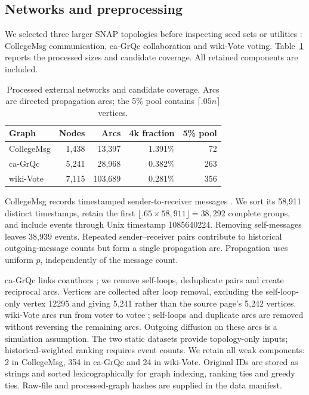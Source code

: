 \documentclass[smallextended]{svjour3}
\begin{document}
\subsection{Networks and preprocessing}
We selected three larger SNAP topologies before inspecting seed sets or utilities \cite{snap}: CollegeMsg communication, ca-GrQc collaboration and wiki-Vote voting. Table~\ref{tab:data} reports the processed sizes and candidate coverage. All retained components are included.
\begin{table}[htbp]
\caption{Processed external networks and candidate coverage. Arcs are directed propagation arcs; the 5\% pool contains $\lceil .05n\rceil$ vertices.}\label{tab:data}
\begin{tabular}{lrrrr}
\toprule
Graph & Nodes & Arcs & 4k fraction & 5\% pool \\
\midrule
CollegeMsg & 1,438 & 13,397 & 1.391\% & 72 \\
ca-GrQc & 5,241 & 28,968 & 0.382\% & 263 \\
wiki-Vote & 7,115 & 103,689 & 0.281\% & 356 \\
\bottomrule
\end{tabular}
\end{table}

CollegeMsg records timestamped sender-to-receiver messages \cite{college}. We sort its 58,911 distinct timestamps, retain the first $\lfloor .65\times58,911\rfloor=38,292$ complete groups, and include events through Unix timestamp 1085640224. Removing self-messages leaves 38,939 events. Repeated sender--receiver pairs contribute to historical outgoing-message counts but form a single propagation arc. Propagation uses uniform $p$, independently of the message count.

ca-GrQc links coauthors \cite{grqc}; we remove self-loops, deduplicate pairs and create reciprocal arcs. Vertices are collected after loop removal, excluding the self-loop-only vertex 12295 and giving 5,241 rather than the source page's 5,242 vertices. wiki-Vote arcs run from voter to votee \cite{signed,links}; self-loops and duplicate arcs are removed without reversing the remaining arcs. Outgoing diffusion on these arcs is a simulation assumption. The two static datasets provide topology-only inputs; historical-weighted ranking requires event counts. We retain all weak components: 2 in CollegeMsg, 354 in ca-GrQc and 24 in wiki-Vote. Original IDs are stored as strings and sorted lexicographically for graph indexing, ranking ties and greedy ties. Raw-file and processed-graph hashes are supplied in the data manifest.
\end{document}
